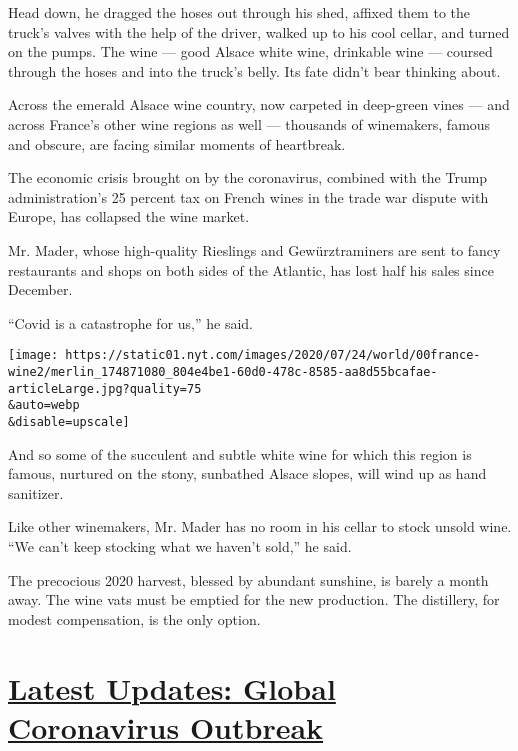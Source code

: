 Head down, he dragged the hoses out through his shed, affixed them to
the truck's valves with the help of the driver, walked up to his cool
cellar, and turned on the pumps. The wine --- good Alsace white wine,
drinkable wine --- coursed through the hoses and into the truck's belly.
Its fate didn't bear thinking about.

Across the emerald Alsace wine country, now carpeted in deep-green vines
--- and across France's other wine regions as well --- thousands of
winemakers, famous and obscure, are facing similar moments of
heartbreak.

The economic crisis brought on by the coronavirus, combined with the
Trump administration's 25 percent tax on French wines in the trade war
dispute with Europe, has collapsed the wine market.

Mr. Mader, whose high-quality Rieslings and Gewürztraminers are sent to
fancy restaurants and shops on both sides of the Atlantic, has lost half
his sales since December.

``Covid is a catastrophe for us,'' he said.

\texttt{[image: https://static01.nyt.com/images/2020/07/24/world/00france-wine2/merlin\_174871080\_804e4be1-60d0-478c-8585-aa8d55bcafae-articleLarge.jpg?quality=75\\\&auto=webp\\\&disable=upscale]}

And so some of the succulent and subtle white wine for which this region
is famous, nurtured on the stony, sunbathed Alsace slopes, will wind up
as hand sanitizer.

Like other winemakers, Mr. Mader has no room in his cellar to stock
unsold wine. ``We can't keep stocking what we haven't sold,'' he said.

The precocious 2020 harvest, blessed by abundant sunshine, is barely a
month away. The wine vats must be emptied for the new production. The
distillery, for modest compensation, is the only option.

\hypertarget{latest-updates-global-coronavirus-outbreak}{%
\section{\texorpdfstring{\href{https://www.nytimes.com/2020/08/03/world/coronavirus-covid-19.html?action=click\&pgtype=Article\&state=default\&region=MAIN_CONTENT_1\&context=storylines_live_updates}{Latest
Updates: Global Coronavirus
Outbreak}}{Latest Updates: Global Coronavirus Outbreak}}\label{latest-updates-global-coronavirus-outbreak}}

